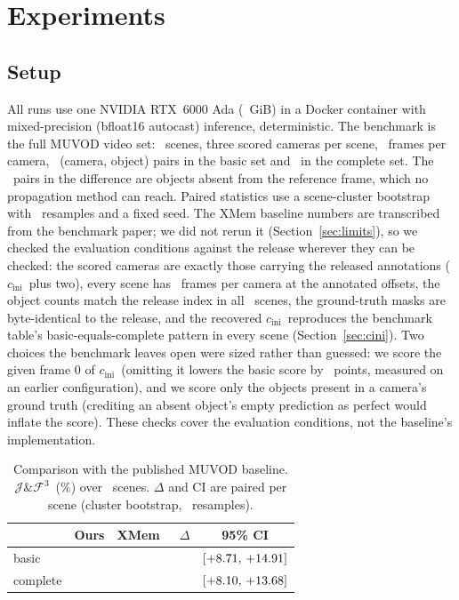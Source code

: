 \documentclass[journal]{IEEEtran}
\newcommand{\JF}{\ensuremath{\mathcal{J}\&\mathcal{F}^{3}}}
\newcommand{\cini}{\ensuremath{c_{\mathrm{ini}}}}
\begin{document}
\section{Experiments}
\label{sec:exp}

\subsection{Setup}
\label{sec:setup}
All runs use one NVIDIA RTX~6000 Ada (\gpuTotal~GiB) in a Docker container
with mixed-precision (bfloat16 autocast) inference, deterministic. The benchmark is the full MUVOD video set: \nScenes\
scenes, three scored cameras per scene, \nFramesPerCam\ frames per
camera, \nPairsBasic\ (camera, object) pairs in the basic set and
\nPairsComplete\ in the complete set. The \nPairsUnreachable\ pairs in the
difference are objects absent from the reference frame, which no propagation
method can reach. Paired statistics use a scene-cluster bootstrap with
\nBoot\ resamples and a fixed seed. The XMem baseline numbers are transcribed
from the benchmark paper; we did not rerun it (Section~\ref{sec:limits}), so
we checked the evaluation conditions against the release wherever they can be
checked: the scored cameras are exactly those carrying the released
annotations (\cini\ plus two), every scene has \nFramesPerCam\ frames per
camera at the annotated offsets, the object counts match the release index in
all \nScenes\ scenes, the ground-truth masks are byte-identical to the
release, and the recovered \cini\ reproduces the benchmark table's
basic-equals-complete pattern in every scene (Section~\ref{sec:cini}). Two
choices the benchmark leaves open were sized rather than guessed: we score the
given frame 0 of \cini\ (omitting it lowers the basic score by
\protocolDiscretion\ points, measured on an earlier configuration), and we
score only the objects present in a camera's ground truth (crediting an
absent object's empty prediction as perfect would inflate the score). These
checks cover the evaluation conditions, not the baseline's implementation.

\begin{table}[!t]
\caption{Comparison with the published MUVOD baseline. \JF\ (\%) over
\nScenes\ scenes. $\Delta$ and CI are paired per scene (cluster bootstrap,
\nBoot\ resamples).}
\label{tab:headline}
\centering
\begin{tabular}{lcccc}
\toprule
 & Ours & XMem~\cite{muvod} & $\Delta$ & 95\% CI \\
\midrule
basic    & \textbf{\OursBasic}    & \XMemBasic    & \textbf{\DeltaBasic}    & $[+8.71,\,+14.91]$ \\
complete & \textbf{\OursComplete} & \XMemComplete & \textbf{\DeltaComplete} & $[+8.10,\,+13.68]$ \\
\bottomrule
\end{tabular}
\end{table}
\end{document}
